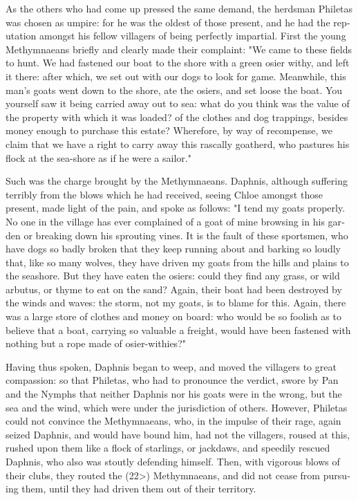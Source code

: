 \documentclass{book}
\begin{document}
\begin{pairs}
\begin{Rightside}
\begin{english}
  As the others who had come up pressed the same demand, the herdsman Philetas was chosen as umpire: for he was the oldest of those present, and he had the reputation amongst his fellow villagers of being perfectly impartial.  First the young Methymnaeans briefly and clearly made their complaint:  "We came to these fields to hunt.  We had fastened our boat to the shore with a green osier withy, and left it there: after which, we set out with our dogs to look for game.  Meanwhile, this man's goats went down to the shore, ate the osiers, and set loose the boat.  You yourself saw it being carried away out to sea: what do you think was the value of the property with which it was loaded? of the clothes and dog trappings, besides money enough to purchase this estate?  Wherefore, by way of recompense, we claim that we have a right to carry away this rascally goatherd, who pastures his flock at the sea-shore as if he were a sailor."
\pend


  Such was the charge brought by the Methymnaeans.  Daphnis, although suffering terribly from the blows which he had received, seeing Chloe amongst those present, made light of the pain, and spoke as follows:  "I tend my goats properly.  No one in the village has ever complained of a goat of mine browsing in his garden or breaking down his sprouting vines.  It is the fault of these sportsmen, who have dogs so badly broken that they keep running about and barking so loudly that, like so many wolves, they have driven my goats from the hills and plains to the seashore.  But they have eaten the osiers: could they find any grass, or wild arbutus, or thyme to eat on the sand?  Again, their boat had been destroyed by the winds and waves: the storm, not my goats, is to blame for this.  Again, there was a large store of clothes and money on board: who would be so foolish as to believe that a boat, carrying so valuable a freight, would have been fastened with nothing but a rope made of osier-withies?"
\pend


  Having thus spoken, Daphnis began to weep, and moved the villagers to great compassion: so that Philetas, who had to pronounce the verdict, swore by Pan and the Nymphs that neither Daphnis nor his goats were in the wrong, but the sea and the wind, which were under the jurisdiction of others.  However, Philetas could not convince the Methymnaeans, who, in the impulse of their rage, again seized Daphnis, and would have bound him, had not the villagers, roused at this, rushed upon them like a flock of starlings, or jackdaws, and speedily rescued Daphnis, who also was stoutly defending himself.  Then, with vigorous blows of their clubs, they routed the (22>) Methymnaeans, and did not cease from pursuing them, until they had driven them out of their territory.
\pend



\end{english}
\end{Rightside}
\end{pairs}
\end{document}
